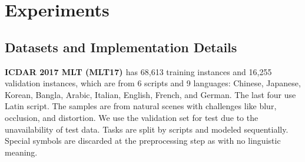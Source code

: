\documentclass[10pt,twocolumn,letterpaper]{article}
\begin{document}
\begin{table}[]
\begin{center}
\end{center}
\caption{MLT17 and MLT19 statistics in our experiments.}
\label{table:mlt_datasets}
\end{table}


\section{Experiments}
\subsection{Datasets and Implementation Details} \label{DID}


\noindent\textbf{ICDAR 2017 MLT (MLT17) \cite{nayef2017mlt2017}}
has 68,613 training instances and 16,255 validation instances, which are from 6 scripts and 9 languages: Chinese, Japanese, Korean, Bangla, Arabic, Italian, English, French, and German. The last four use Latin script. The samples are from natural scenes with challenges like blur, occlusion, and distortion. We use the validation set for test due to the unavailability of test data. Tasks are split by scripts and modeled sequentially. Special symbols are discarded at the preprocessing step as with no linguistic meaning.
\end{document}
